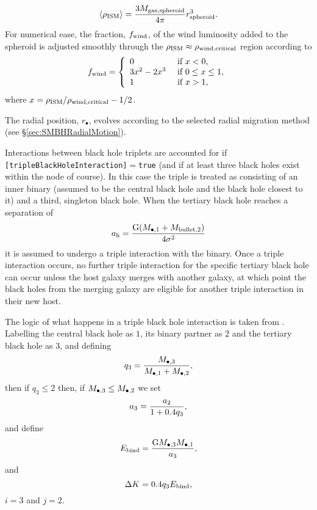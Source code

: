 \begin{description}
\begin{equation}
 \langle\rho_{\rm ISM}\rangle = {3 M_{\rm gas, spheroid} \over 4 \pi} r_{\rm spheroid}^3.
\end{equation}
For numerical ease, the fraction, $f_{\rm wind}$, of the wind luminosity added to the spheroid is adjusted smoothly through the $\rho_{\rm ISM}\approx\rho_{\rm wind,critical}$ region according to
\begin{equation}
 f_{\rm wind} = \left\{ \begin{array}{ll} 0 & \hbox{ if } x < 0, \\ 3x^2-2x^3 & \hbox{ if } 0 \le x \le 1, \\ 1 & \hbox{ if } x > 1, \end{array} \right.
\end{equation}
where $x=\rho_{\rm ISM}/\rho_{\rm wind,critical}-1/2$.
\end{description}

The radial position, $r_\bullet$, evolves according to the selected radial migration method (see \S\ref{sec:SMBHRadialMotion}).

Interactions between black hole triplets are accounted for if {\tt [tripleBlackHoleInteraction]}$=${\tt true} (and if at least three black holes exist within the \gls{node} of course). In this case the triple is treated as consisting of an inner binary (assumed to be the central black hole and the black hole closest to it) and a third, singleton black hole. When the tertiary black hole reaches a separation of 
\begin{equation}
a_{\rm h}= {{\rm G} (M_{\bullet, 1} + M_{\rm bullet, 2}) \over 4 \sigma^2}
\end{equation}
it is assumed to undergo a triple interaction with the binary. Once a triple interaction occurs, no further triple interaction for the specific tertiary black hole can occur unless the host galaxy merges with another galaxy, at which point the black holes from the merging galaxy are eligible for another triple interaction in their new host.

The logic of what happens in a triple black hole interaction is taken from \cite{volonteri_assembly_2003}. Labelling the central black hole as $1$, its binary partner as $2$ and the tertiary black hole as $3$, and defining
\begin{equation}
q_3 = {M_{\bullet, 3} \over M_{\bullet, 1} + M_{\rm \bullet, 2} },
\end{equation}
then if $q_3 \le 2$ then, if $M_{\bullet, 3} \le M_{\rm \bullet, 2}$ we set
\begin{equation}
a_3 = {a_2 \over 1 + 0.4 q_3}, 
\end{equation}
and define
\begin{equation}
E_{\rm bind} = {{\rm G} M_{\bullet, 3} M_{\bullet, 1} \over a_3},
\end{equation}
and
\begin{equation}
\Delta K =0.4 q_3 E_{\rm bind},
\end{equation}
$i=3$ and $j=2$. 

